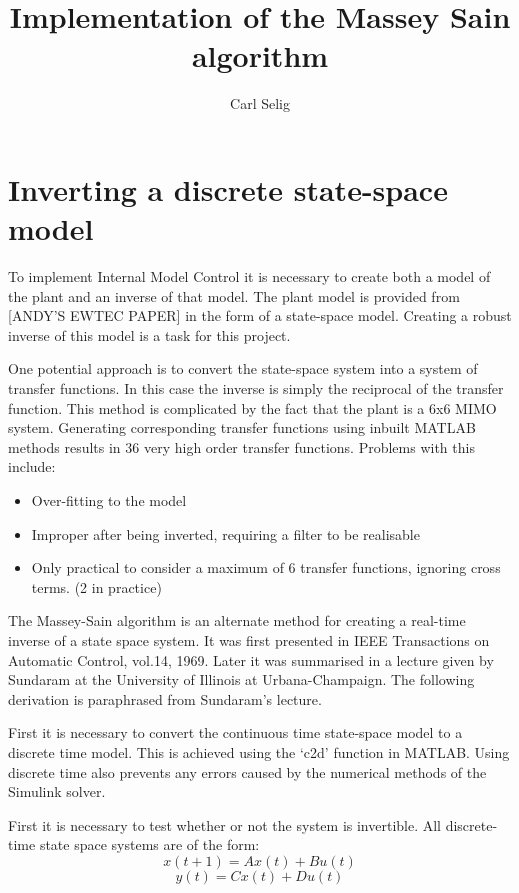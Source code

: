 \documentclass{article}
\begin{document}
\title{Implementation of the Massey Sain algorithm}
\author{Carl Selig}

\maketitle
\newpage

\section{Inverting a discrete state-space model}
To implement Internal Model Control it is necessary to create both a model of the plant and an inverse of that model. The plant model is provided from [ANDY’S EWTEC PAPER] in the form of a state-space model. Creating a robust inverse of this model is a task for this project.

One potential approach is to convert the state-space system into a system of transfer functions. In this case the inverse is simply the reciprocal of the transfer function. This method is complicated by the fact that the plant is a 6x6 MIMO system. Generating corresponding transfer functions using inbuilt MATLAB methods results in 36 very high order transfer functions. Problems with this include:
\begin{itemize}
	\item{Over-fitting to the model}
	\item{Improper after being inverted, requiring a filter to be realisable}
	\item{Only practical to consider a maximum of 6 transfer functions, ignoring cross terms. (2 in practice)}
\end{itemize}


The Massey-Sain algorithm is an alternate method for creating a real-time inverse of a state space system. It was first presented in IEEE Transactions on Automatic Control, vol.14, 1969. Later it was summarised in a lecture given by Sundaram at the University of Illinois at Urbana-Champaign. The following derivation is paraphrased from Sundaram's lecture.

First it is necessary to convert the continuous time state-space model to a discrete time model. This is achieved using the ‘c2d’ function in MATLAB. Using discrete time also prevents any errors caused by the numerical methods of the Simulink solver.

First it is necessary to test whether or not the system is invertible. All discrete-time state space systems are of the form:
\begin{equation}
	x(t+1)=Ax(t)+Bu(t)
\end{equation}
\begin{equation}
	y(t)=Cx(t)+Du(t)
\end{equation}
\end{document}
